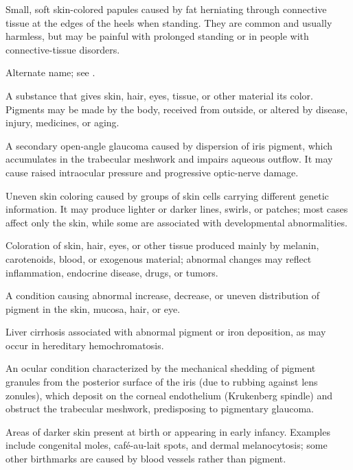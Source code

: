  Small, soft skin-colored papules caused by fat herniating through connective tissue at the edges of the heels when standing. They are common and usually harmless, but may be painful with prolonged standing or in people with connective-tissue disorders.

 Alternate name; see .

 A substance that gives skin, hair, eyes, tissue, or other material its color. Pigments may be made by the body, received from outside, or altered by disease, injury, medicines, or aging.

 A secondary open-angle glaucoma caused by dispersion of iris pigment, which accumulates in the trabecular meshwork and impairs aqueous outflow. It may cause raised intraocular pressure and progressive optic-nerve damage.

 Uneven skin coloring caused by groups of skin cells carrying different genetic information. It may produce lighter or darker lines, swirls, or patches; most cases affect only the skin, while some are associated with developmental abnormalities.

 Coloration of skin, hair, eyes, or other tissue produced mainly by melanin, carotenoids, blood, or exogenous material; abnormal changes may reflect inflammation, endocrine disease, drugs, or tumors.

 A condition causing abnormal increase, decrease, or uneven distribution of pigment in the skin, mucosa, hair, or eye.

 Liver cirrhosis associated with abnormal pigment or iron deposition, as may occur in hereditary hemochromatosis.

 An ocular condition characterized by the mechanical shedding of pigment granules from the posterior surface of the iris (due to rubbing against lens zonules), which deposit on the corneal endothelium (Krukenberg spindle) and obstruct the trabecular meshwork, predisposing to pigmentary glaucoma.

 Areas of darker skin present at birth or appearing in early infancy. Examples include congenital moles, café-au-lait spots, and dermal melanocytosis; some other birthmarks are caused by blood vessels rather than pigment.

